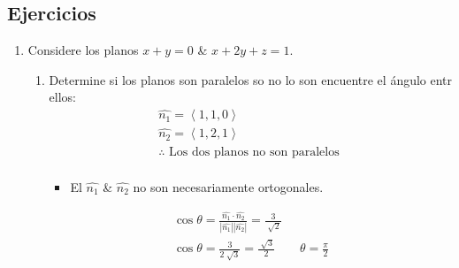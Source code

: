\documentclass{article}
\begin{document}
\subsection{Ejercicios}
\begin{enumerate}
    \item Considere los planos $x+y=0$ \& $x+2y+z=1$.
        \begin{enumerate}
            \item Determine si los planos son paralelos so no lo son encuentre el ángulo entr ellos:
                \begin{align*}
                    \hat{n_1} = \left\langle 1,1,0 \right\rangle \\ 
                    \hat{n_2} = \left\langle 1,2,1 \right\rangle \\ 
                    \therefore \text{  Los dos planos no son paralelos  } \\ 
                \end{align*}
                \begin{itemize}
                    \item El $\hat{n_1}$ \& $\hat{n_2}$ no son necesariamente ortogonales.
                \end{itemize}
                \begin{align*}
                    \cos \theta = \frac{\hat{n_1}\cdot\hat{n_2}}{\left| \hat{n_1} \right|\left| \hat{n_2} \right| } = \frac{3}{\sqrt[]{2}} \\ 
                    \cos \theta = \frac{3}{2\sqrt[]{3}}=\frac{\sqrt[]{3}}{2} \qquad \theta = \frac{\pi}{2} \\   
                \end{align*}
        \end{enumerate}
    

\end{enumerate}
\end{document}

